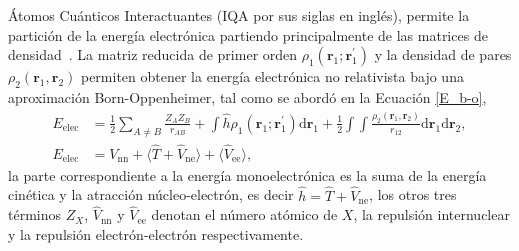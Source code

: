 Átomos Cuánticos Interactuantes (IQA por sus siglas en inglés), permite la
partición de la energía electrónica partiendo principalmente de las matrices de
densidad~\cite{blanco2005, mcweeny}. La matriz reducida de primer orden
$\rho_1(\mathbf{r}_1;\mathbf{r}_1^{\prime})$ y la densidad de pares
$\rho_2(\mathbf{r}_1,\mathbf{r}_2)$ permiten obtener la energía electrónica no
relativista bajo una aproximación Born-Oppenheimer, tal como se abordó en la
Ecuación \ref{E_b-o},
\begin{align}
  E_{\mathrm{elec}} & = \frac{1}{2} \sum_{A \neq B} \frac{Z_A Z_B}{r_{AB}} 
    + \int \widehat{h} \rho_1(\mathbf{r}_1;\mathbf{r}_1^{\prime}) \mathrm{d} \mathbf{r}_1 
    + \frac{1}{2} \int \int \frac{\rho_2(\mathbf{r}_1,\mathbf{r}_2)}{r_{12}} 
    \mathrm{d} \mathbf{r}_1 \mathrm{d} \mathbf{r}_2, \label{base}\\
  E_{\mathrm{elec}} & = V_{\mathrm{nn}}
    + \langle \widehat{T} + \widehat{V}_{\mathrm{ne}} \rangle 
    + \langle \widehat{V}_{\mathrm{ee}} \rangle,  
\end{align}
%
\noindent la parte correspondiente a la energía monoelectrónica es la suma de
la energía cinética y la atracción núcleo-electrón, es decir $\widehat{h} =
\widehat{T} + \widehat{V}_{\mathrm{ne}}$, los otros tres términos $Z_X$,
$\widehat{V}_{\mathrm{nn}}$ y $\widehat{V}_{\mathrm{ee}}$ denotan el número
atómico de $X$, la repulsión internuclear y la repulsión electrón-electrón
respectivamente.

%
%
%

